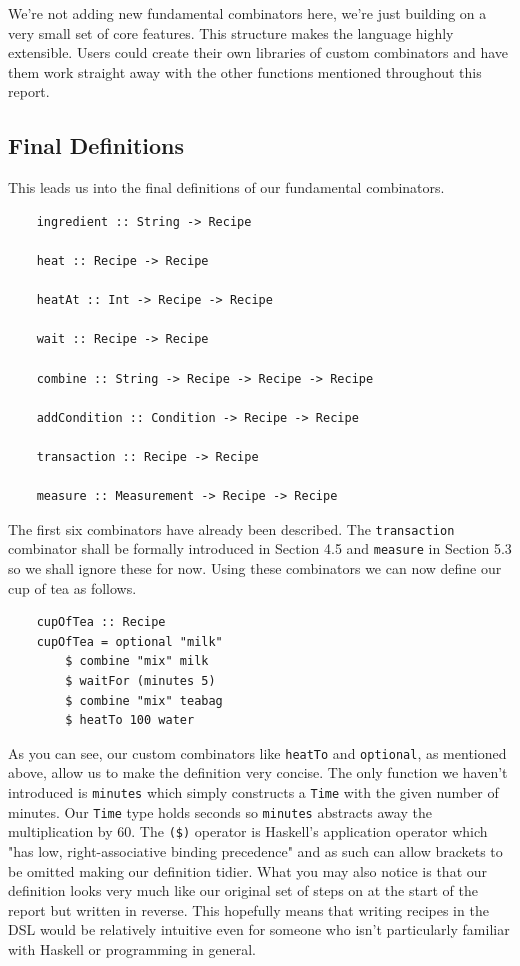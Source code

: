 \documentclass[11pt]{article}
\begin{document}
We're not adding new fundamental combinators here, we're just building on a very small
set of core features. This structure makes the language highly extensible. Users could
create their own libraries of custom combinators and have them work straight away with
the other functions mentioned throughout this report.

\subsection{Final Definitions}

This leads us into the final definitions of our fundamental combinators.

\begin{lstlisting}
    ingredient :: String -> Recipe

    heat :: Recipe -> Recipe

    heatAt :: Int -> Recipe -> Recipe

    wait :: Recipe -> Recipe

    combine :: String -> Recipe -> Recipe -> Recipe

    addCondition :: Condition -> Recipe -> Recipe

    transaction :: Recipe -> Recipe

    measure :: Measurement -> Recipe -> Recipe
\end{lstlisting}

The first six combinators have already been described. The \texttt{transaction} combinator
shall be formally introduced in Section 4.5 and \texttt{measure} in Section 5.3 so we shall
ignore these for now. Using these combinators we can now define our cup of tea as follows.

\begin{lstlisting}
    cupOfTea :: Recipe
    cupOfTea = optional "milk"
        $ combine "mix" milk
        $ waitFor (minutes 5)
        $ combine "mix" teabag
        $ heatTo 100 water
\end{lstlisting}

As you can see, our custom combinators like \texttt{heatTo} and \texttt{optional},
as mentioned above, allow us to make the definition very concise. The only function
we haven't introduced is \texttt{minutes} which simply constructs a \texttt{Time} with
the given number of minutes. Our \texttt{Time} type holds seconds so \texttt{minutes}
abstracts away the multiplication by 60. The \texttt{(\$)} operator is Haskell's
application operator which "has low, right-associative binding precedence"\cite{haskell-docs} and
as such can allow brackets to be omitted making our definition tidier. What you may
also notice is that our definition looks very much like our original set of steps
on at the start of the report but written in reverse. This hopefully means that
writing recipes in the DSL would be relatively intuitive even for someone who
isn't particularly familiar with Haskell or programming in general.
\end{document}
